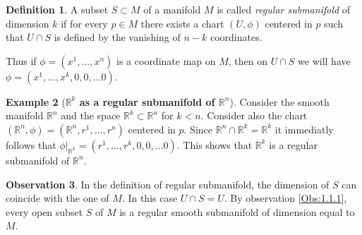 \documentclass[12pt,a4paper]{report}
\theoremstyle{definition}
\newtheorem{Def}{Definition}[chapter]
\theoremstyle{Theorem}
\theoremstyle{definition}
\newtheorem{Ex}[Def]{Example}
\theoremstyle{definition}
\newtheorem{Obs}[Def]{Observation}
\begin{document}
		\begin{Def}
			A subset $S\subset M$ of a manifold $M$ is called \textit{regular submanifold} of dimension $k$ if for every $p\in M$ there exists a chart $(U,\phi)$ centered in $p$ such that $U\cap S$ is defined by the vanishing of $n-k$ coordinates.
		\end{Def}
		Thus if $\phi=(x^1,...,x^n)$ is a coordinate map on $M$, then on $U\cap S$ we will have $\phi=(x^1,...,x^k,0,0,...0)$.
		\begin{Ex} [\textbf{$\mathbb{R}^k$ as a regular submanifold of $\mathbb{R}^n$}]
			Consider the smooth manifold $\mathbb{R}^n$ and the space $\mathbb{R}^k\subset\mathbb{R}^n$ for $k<n$. Consider also the chart $(\mathbb{R}^n,\phi)=(\mathbb{R}^n,r^1,...,r^n)$ centered in $p$. Since $\mathbb{R}^n\cap \mathbb{R}^k=\mathbb{R}^k$ it immediatly follows that $\phi|_{\mathbb{R}^k}=(r^1,...,r^k,0,0,...0)$. This shows that $\mathbb{R}^k$ is a regular submanifold of $\mathbb{R}^n$.
		\end{Ex}
		\begin{Obs} \label{Obs:1.1.2}
			In the definition of regular submanifold, the dimension of $S$ can coincide with the one of $M$. In this case $U\cap S=U$. By observation \ref{Obs:1.1.1}, every open subset $S$ of $M$ is a regular smooth submanifold of dimension equal to $M$.
		\end{Obs}
\end{document}
